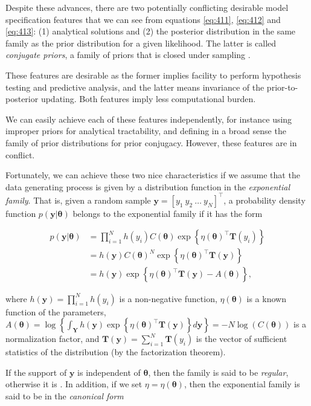 Despite these advances, there are two potentially conflicting desirable model specification features that we can see from equations \ref{eq:411}, \ref{eq:412} and \ref{eq:413}: (1) analytical solutions and (2) the posterior distribution in the same family as the prior distribution for a given likelihood. The latter is called \textit{conjugate priors}, a family of priors that is closed under sampling \cite{schlaifer1961applied}.

These features are desirable as the former implies facility to perform hypothesis testing and predictive analysis, and the latter means invariance of the prior-to-posterior updating. Both features imply less computational burden.

We can easily achieve each of these features independently, for instance using improper priors for analytical tractability, and defining in a broad sense the family of prior distributions for prior conjugacy. However, these features are in conflict. 

Fortunately, we can achieve these two nice characteristics if we assume that the data generating process is given by a distribution function in the \textit{exponential family}. That is, given a random sample $\bm{y}=[y_1 \ y_2 \ \dots \ y_N]^{\top}$, a probability density function $p(\bm{y}|\bm{\theta})$ belongs to the exponential family if it has the form

\begin{align}
	p(\bm{y}|\bm{\theta})&=\prod_{i=1}^N h(y_i) C(\bm{\theta}) \exp\left\{\eta(\bm{\theta})^{\top}\bm{T}(y_i)\right\}\label{eq:414}\\ 
	&=h(\bm{y}) C(\bm{\theta})^N\exp\left\{\eta(\bm{\theta})^{\top}\bm{T}(\bm{y})\right\}\nonumber \\
	&=h(\bm{y})\exp\left\{\eta(\bm{\theta})^{\top}\bm{T}(\bm{y})-A(\bm{\theta})\right\}\nonumber,
\end{align}

where $h(\bm{y})=\prod_{i=1}^N h(y_i)$ is a non-negative function, $\eta(\bm{\theta})$ is a known function of the parameters, $A(\bm{\theta})=\log\left\{\int_{\bm{Y}}h(\bm{y})\exp\left\{\eta(\bm{\theta})^{\top}\bm{T}(\bm{y})\right\}d\bm{y}\right\}=-N\log(C(\bm{\theta}))$ is a normalization factor, and $\bm{T}(\bm{y})=\sum_{i=1}^N\bm{T}(y_i)$ is the vector of sufficient statistics of the distribution (by the factorization theorem).  

If the support of $\bm{y}$ is independent of $\bm{\theta}$, then the family is said to be \textit{regular}, otherwise it is . In addition, if we set $\eta=\eta(\bm{\theta})$, then the exponential family is said to be in the \textit{canonical form} 

